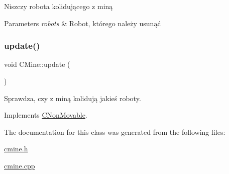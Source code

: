 Niszczy robota kolidującego z miną 


\begin{DoxyParams}{Parameters}
{\em robots} & Robot, którego należy usunąć \\
\hline
\end{DoxyParams}
\mbox{\label{class_c_mine_aef4825eff1e61d284d3da7a2d630acb5}} 
\subsubsection{\texorpdfstring{update()}{update()}}
{\footnotesize\ttfamily void C\+Mine\+::update (\begin{DoxyParamCaption}{ }\end{DoxyParamCaption})\hspace{0.3cm}{\ttfamily [virtual]}}



Sprawdza, czy z miną kolidują jakieś roboty. 



Implements \mbox{\hyperlink{class_c_non_movable_ace03bea0246940c6c5c0b26ffa1ef165}{C\+Non\+Movable}}.



The documentation for this class was generated from the following files\+:\begin{DoxyCompactItemize}
\item 
\mbox{\hyperlink{cmine_8h}{cmine.\+h}}\item 
\mbox{\hyperlink{cmine_8cpp}{cmine.\+cpp}}\end{DoxyCompactItemize}
